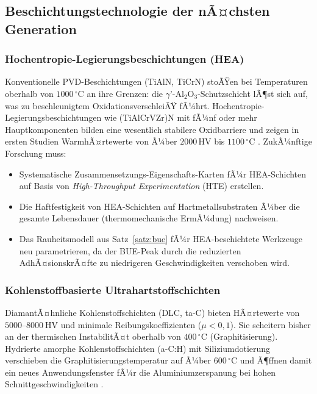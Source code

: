 ﻿\documentclass[a4paper,12pt]{article}
\theoremstyle{definition}
\begin{document}
\subsection{Beschichtungstechnologie der nÃ¤chsten Generation}

\subsubsection{Hochentropie-Legierungsbeschichtungen (HEA)}

Konventionelle PVD-Beschichtungen (TiAlN, TiCrN) stoÃŸen bei Temperaturen
oberhalb von $1000\,^{\circ}\mathrm{C}$ an ihre Grenzen: die $\gamma$'-Al$_2$O$_3$-Schutzschicht
lÃ¶st sich auf, was zu beschleunigtem OxidationsverschleiÃŸ fÃ¼hrt.
Hochentropie-Legierungsbeschichtungen wie (TiAlCrVZr)N mit fÃ¼nf oder mehr
Hauptkomponenten bilden eine wesentlich stabilere Oxidbarriere und zeigen
in ersten Studien WarmhÃ¤rtewerte von Ã¼ber $2000\,\mathrm{HV}$ bis
$1100\,^{\circ}\mathrm{C}$ \cite{mu2018}. ZukÃ¼nftige Forschung muss:

\begin{itemize}
  \item Systematische Zusammensetzungs-Eigenschafts-Karten fÃ¼r HEA-Schichten
        auf Basis von \emph{High-Throughput Experimentation} (HTE) erstellen.
  \item Die Haftfestigkeit von HEA-Schichten auf Hartmetallsubstraten Ã¼ber die
        gesamte Lebensdauer (thermomechanische ErmÃ¼dung) nachweisen.
  \item Das Rauheitsmodell aus Satz~\ref{satz:bue} fÃ¼r HEA-beschichtete
        Werkzeuge neu parametrieren, da der BUE-Peak durch die reduzierten
        AdhÃ¤sionskrÃ¤fte zu niedrigeren Geschwindigkeiten verschoben wird.
\end{itemize}

\subsubsection{Kohlenstoffbasierte Ultrahartstoffschichten}

DiamantÃ¤hnliche Kohlenstoffschichten (DLC, ta-C) bieten HÃ¤rtewerte von
$5000\text{--}8000~\text{HV}$ und minimale Reibungskoeffizienten
($\mu < 0{,}1$). Sie scheitern bisher an der thermischen InstabilitÃ¤t
oberhalb von $400\,^{\circ}\mathrm{C}$ (Graphitisierung). Hydrierte amorphe
Kohlenstoffschichten (a-C:H) mit Siliziumdotierung verschieben die
Graphitisierungstemperatur auf Ã¼ber $600\,^{\circ}\mathrm{C}$ und Ã¶ffnen damit
ein neues Anwendungsfenster fÃ¼r die Aluminiumzerspanung bei hohen
Schnittgeschwindigkeiten \cite{voevodin2005}.
\end{document}
